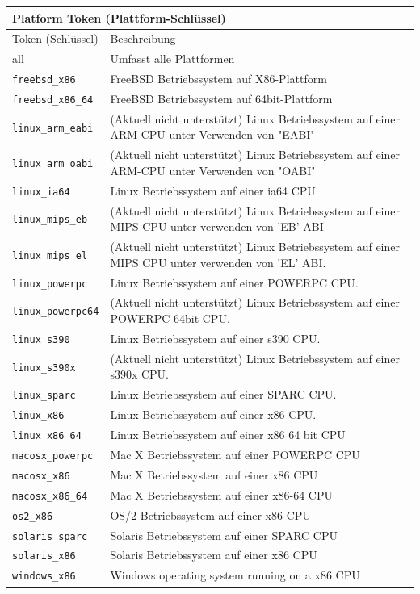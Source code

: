 \documentclass[a4paper,10pt,pagesize,titlepage]{scrbook}
\begin{document}
\begin{tabular}{ |p{3cm}|p{9cm} | }
	
	\multicolumn{2}{l}{\textbf{Platform Token (Plattform-Schlüssel)}}\\
	\toprule
	\rowcolor{hellgrau}
	Token (Schlüssel)& Beschreibung\\
	\hline
	all   & Umfasst alle Plattformen\\
	\hline
    \verb|freebsd_x86|& FreeBSD Betriebssystem auf X86-Plattform\\
    \hline
    \verb|freebsd_x86_64|& FreeBSD Betriebssystem auf 64bit-Plattform\\
    \hline
    \verb|linux_arm_eabi|& (Aktuell nicht unterstützt) Linux Betriebssystem auf einer ARM-CPU unter Verwenden von "EABI"\\
    \hline
    \verb|linux_arm_oabi|& (Aktuell nicht unterstützt) Linux Betriebssystem auf einer ARM-CPU unter Verwenden von "OABI"\\
    \hline
    \verb|linux_ia64| &	Linux Betriebssystem auf einer ia64 CPU\\
    \hline
    \verb|linux_mips_eb| &	(Aktuell nicht unterstützt) Linux Betriebssystem auf einer MIPS CPU unter verwenden von 'EB' ABI\\
    \hline
    \verb|linux_mips_el| &	(Aktuell nicht unterstützt) Linux Betriebssystem auf einer MIPS CPU unter verwenden von 'EL' ABI.\\
    \hline
    \verb|linux_powerpc| &	Linux Betriebssystem auf einer POWERPC CPU.\\
    \hline
    \verb|linux_powerpc64| & (Aktuell nicht unterstützt) Linux Betriebssystem auf einer POWERPC 64bit CPU.\\
    \hline
    \verb|linux_s390| &	Linux Betriebssystem auf einer s390 CPU.\\
    \hline
    \verb|linux_s390x| & (Aktuell nicht unterstützt) Linux Betriebssystem auf einer s390x CPU.\\
    \hline
    \verb|linux_sparc| & Linux Betriebssystem auf einer SPARC CPU.\\
    \hline
    \verb|linux_x86| &	Linux Betriebssystem auf einer x86 CPU.\\
    \hline
    \verb|linux_x86_64| & Linux Betriebssystem auf einer x86 64 bit CPU\\
    \hline
    \verb|macosx_powerpc| &	Mac X Betriebssystem auf einer POWERPC CPU\\
    \hline
    \verb|macosx_x86| &	Mac X Betriebssystem auf einer x86 CPU\\
    \hline
    \verb|macosx_x86_64| & 	Mac X Betriebssystem auf einer x86-64 CPU\\
    \hline
    \verb|os2_x86| & OS/2 Betriebssystem auf einer x86 CPU\\
    \hline
    \verb|solaris_sparc| & 	Solaris Betriebssystem auf einer SPARC CPU\\
    \hline
    \verb|solaris_x86| & Solaris Betriebssystem auf einer x86 CPU\\
    \hline
    \verb|windows_x86| & Windows operating system running on a x86 CPU\\ 
    \bottomrule
\end{tabular}
\end{document}
